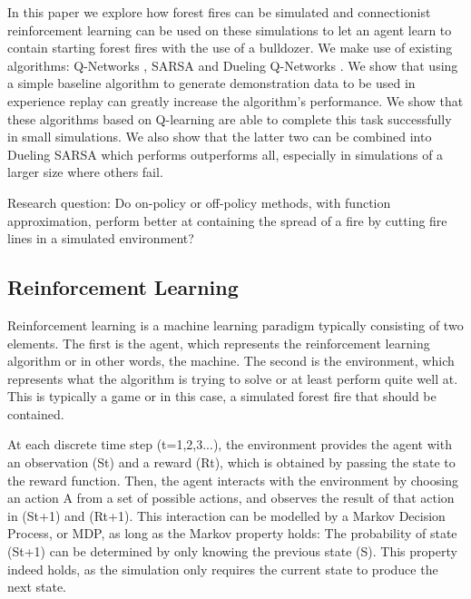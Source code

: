 In this paper we explore how forest fires can be simulated and connectionist reinforcement learning can be used on these simulations to let an agent learn to contain starting forest fires with the use of a bulldozer. We make use of existing algorithms: Q-Networks \citep{mnih2015human}, SARSA and Dueling Q-Networks \citep{wang2015dueling}. We show that using a simple baseline algorithm to generate demonstration data to be used in experience replay can greatly increase the algorithm's performance. We show that these algorithms based on Q-learning are able to complete this task successfully in small simulations. We also show that the latter two can be combined into Dueling SARSA which performs outperforms all, especially in simulations of a larger size where others fail.


Research question: Do on-policy or off-policy methods, with function approximation, perform better at containing the spread of a fire by cutting fire lines in a simulated environment?

\subsection{Reinforcement Learning}\label{sec:reinforcementlearning}
Reinforcement learning is a machine learning paradigm typically consisting of two elements. The first is the agent, which represents the reinforcement learning algorithm or in other words, the machine. The second is the environment, which represents what the algorithm is trying to solve or at least perform quite well at. This is typically a game or in this case, a simulated forest fire that should be contained.

At each discrete time step (t=1,2,3...), the environment provides the agent with an observation (St) and a reward (Rt), which is obtained by passing the state to the reward function. Then, the agent interacts with the environment by choosing an action A from a set of possible actions, and observes the result of that action in (St+1) and (Rt+1). This interaction can be modelled by a Markov Decision Process, or MDP, as long as the Markov property holds: The probability of state (St+1) can be determined by only knowing the previous state (S). This property indeed holds, as the simulation only requires the current state to produce the next state.

